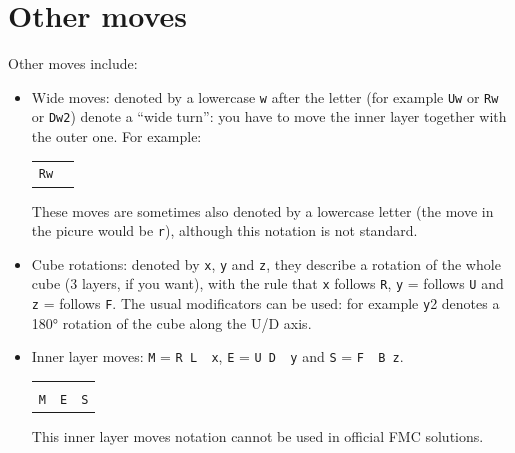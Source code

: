 \documentclass[11pt,a4paper]{book}
\newcommand{\p}{\textquotesingle}
\newcommand{\m}{\texttt}
\newcommand{\ps}{\p\,\,}
\begin{document}
\newpage

\section*{Other moves}

Other moves include:
\begin{itemize}
\item Wide moves: denoted by a lowercase \m w after the letter (for example \m{Uw} or \m{Rw\p} or \m{Dw2}) denote a ``wide turn'': you have to move the inner layer together with the outer one. For example:

\begin{center}
\begin{tabular}{cc}
\m{Rw} \\

\end{tabular}
\end{center}

These moves are sometimes also denoted by a lowercase letter (the move in the picure would be \m{r}), although this notation is not standard.
\item Cube rotations: denoted by \m x, \m y and \m z, they describe a rotation of the whole cube (3 layers, if you want), with the rule that \m x follows \m R, \m y = follows \m U and \m z = follows \m F. The usual modificators can be used: for example \m y2 denotes a 180° rotation of the cube along the U/D axis.
\item Inner layer moves: \m M = \m{R L\ps x\p}, \m E = \m{U D\ps y\p} and \m{S} = \m{F\ps B z}.
\begin{center}
\begin{tabular}{|c|c|c|}
\hline
 &  & \\
\m M & \m E & \m S\\
\hline
\end{tabular}
\end{center}
This inner layer moves notation cannot be used in official FMC solutions.
\end{itemize}
\end{document}
